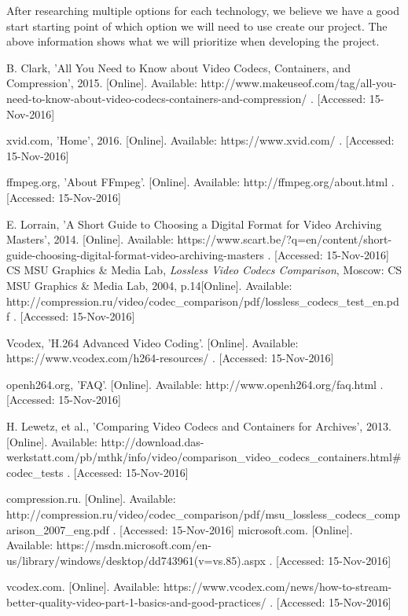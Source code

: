 \documentclass[onecolumn, draftclsnofoot,10pt, compsoc]{IEEEtran}
\begin{document}
After researching multiple options for each technology, we believe we have a good start starting point of which option we will need to use create our project.
The above information shows what we will prioritize when developing the project.

\newpage
\begin{thebibliography}{99}
B. Clark, 'All You Need to Know about Video Codecs, Containers, and Compression', 2015. [Online]. Available: http://www.makeuseof.com/tag/all-you-need-to-know-about-video-codecs-containers-and-compression/ . [Accessed: 15-Nov-2016]

xvid.com, 'Home', 2016. [Online]. Available: https://www.xvid.com/ . [Accessed: 15-Nov-2016]

ffmpeg.org, 'About FFmpeg'. [Online]. Available: http://ffmpeg.org/about.html . [Accessed: 15-Nov-2016]

E. Lorrain, 'A Short Guide to Choosing a Digital Format for Video Archiving Masters', 2014. [Online]. Available: https://www.scart.be/?q=en/content/short-guide-choosing-digital-format-video-archiving-masters . [Accessed: 15-Nov-2016]
CS MSU Graphics \& Media Lab, \textit{Lossless Video Codecs Comparison}, Moscow: CS MSU Graphics \& Media Lab, 2004, p.14[Online]. Available: http://compression.ru/video/codec\_comparison/pdf/lossless\_codecs\_test\_en.pdf . [Accessed: 15-Nov-2016]

Vcodex, 'H.264 Advanced Video Coding'. [Online]. Available: https://www.vcodex.com/h264-resources/ . [Accessed: 15-Nov-2016]

openh264.org, 'FAQ'. [Online]. Available: http://www.openh264.org/faq.html . [Accessed: 15-Nov-2016]

H. Lewetz, et al., 'Comparing Video Codecs and Containers for Archives', 2013. [Online]. Available: http://download.das-werkstatt.com/pb/mthk/info/video/comparison\_video\_codecs\_containers.html\#codec\_tests . [Accessed: 15-Nov-2016]

compression.ru. [Online]. Available: http://compression.ru/video/codec\_comparison/pdf/msu\_lossless\_codecs\_comparison\_2007\_eng.pdf . [Accessed: 15-Nov-2016]
microsoft.com. [Online]. Available: https://msdn.microsoft.com/en-us/library/windows/desktop/dd743961(v=vs.85).aspx . [Accessed: 15-Nov-2016]

vcodex.com. [Online]. Available: https://www.vcodex.com/news/how-to-stream-better-quality-video-part-1-basics-and-good-practices/ . [Accessed: 15-Nov-2016]


\end{thebibliography}
\end{document}
